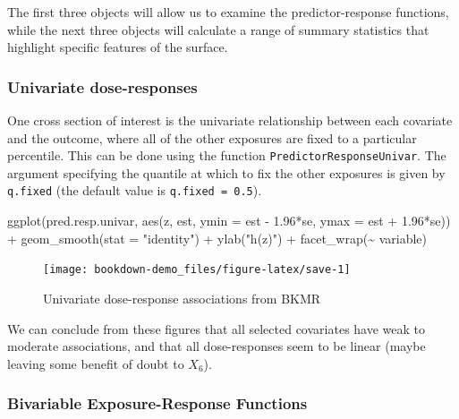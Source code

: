 \documentclass[
]{book}
\newenvironment{Shaded}{\begin{snugshade}}{\end{snugshade}}
\newcommand{\AttributeTok}[1]{\textcolor[rgb]{0.77,0.63,0.00}{#1}}
\newcommand{\FloatTok}[1]{\textcolor[rgb]{0.00,0.00,0.81}{#1}}
\newcommand{\FunctionTok}[1]{\textcolor[rgb]{0.00,0.00,0.00}{#1}}
\newcommand{\NormalTok}[1]{#1}
\newcommand{\SpecialCharTok}[1]{\textcolor[rgb]{0.00,0.00,0.00}{#1}}
\newcommand{\StringTok}[1]{\textcolor[rgb]{0.31,0.60,0.02}{#1}}
\begin{document}
The first three objects will allow us to examine the predictor-response functions, while the next three objects will calculate a range of summary statistics that highlight specific features of the surface.

\hypertarget{univariate-dose-responses}{%
\subsubsection{Univariate dose-responses}\label{univariate-dose-responses}}

One cross section of interest is the univariate relationship between each covariate and the outcome, where all of the other exposures are fixed to a particular percentile. This can be done using the function \texttt{PredictorResponseUnivar}. The argument specifying the quantile at which to fix the other exposures is given by \texttt{q.fixed} (the default value is \texttt{q.fixed\ =\ 0.5}).

\begin{Shaded}
\begin{Highlighting}[]
\FunctionTok{ggplot}\NormalTok{(pred.resp.univar, }\FunctionTok{aes}\NormalTok{(z, est, }\AttributeTok{ymin =}\NormalTok{ est }\SpecialCharTok{{-}} \FloatTok{1.96}\SpecialCharTok{*}\NormalTok{se, }\AttributeTok{ymax =}\NormalTok{ est }\SpecialCharTok{+} \FloatTok{1.96}\SpecialCharTok{*}\NormalTok{se)) }\SpecialCharTok{+} 
  \FunctionTok{geom\_smooth}\NormalTok{(}\AttributeTok{stat =} \StringTok{"identity"}\NormalTok{) }\SpecialCharTok{+} \FunctionTok{ylab}\NormalTok{(}\StringTok{"h(z)"}\NormalTok{) }\SpecialCharTok{+} \FunctionTok{facet\_wrap}\NormalTok{(}\SpecialCharTok{\textasciitilde{}}\NormalTok{ variable) }
\end{Highlighting}
\end{Shaded}

\begin{figure}[H]

{\centering \texttt{[image: bookdown-demo\_files/figure-latex/save-1]} 

}

\caption{Univariate dose-response associations from BKMR}\label{fig:save}
\end{figure}

We can conclude from these figures that all selected covariates have weak to moderate associations, and that all dose-responses seem to be linear (maybe leaving some benefit of doubt to \(X_6\)).

\hypertarget{bivariable-exposure-response-functions}{%
\subsubsection{Bivariable Exposure-Response Functions}\label{bivariable-exposure-response-functions}}
\end{document}
